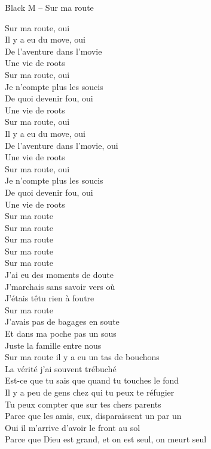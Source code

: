 \documentclass{novel}
\begin{document}
\newpage
\normalsize
\h*{Black M – Sur ma route}
\begin{multicols}{2}
Sur ma route, oui \\
Il y a eu du move, oui \\
De l'aventure dans l'movie \\
Une vie de roots \\
Sur ma route, oui \\
Je n'compte plus les soucis \\
De quoi devenir fou, oui \\
Une vie de roots \\

Sur ma route, oui \\
Il y a eu du move, oui \\
De l'aventure dans l'movie, oui \\
Une vie de roots \\
Sur ma route, oui \\
Je n'compte plus les soucis \\
De quoi devenir fou, oui \\
Une vie de roots \\

Sur ma route \\
Sur ma route \\
Sur ma route \\
Sur ma route \\

Sur ma route \\
J'ai eu des moments de doute \\
J'marchais sans savoir vers où \\
J'étais têtu rien à foutre \\
Sur ma route \\
J'avais pas de bagages en soute \\
Et dans ma poche pas un sous \\
Juste la famille entre nous \\
Sur ma route il y a eu un tas de bouchons \\

La vérité j'ai souvent trébuché \\
Est-ce que tu sais que quand tu touches le fond \\
Il y a peu de gens chez qui tu peux te réfugier \\
Tu peux compter que sur tes chers parents \\
Parce que les amis, eux, disparaissent un par un \\
Oui il m'arrive d'avoir le front au sol \\
Parce que Dieu est grand, et on est seul, on meurt seul \\


\end{multicols}
\end{document}
